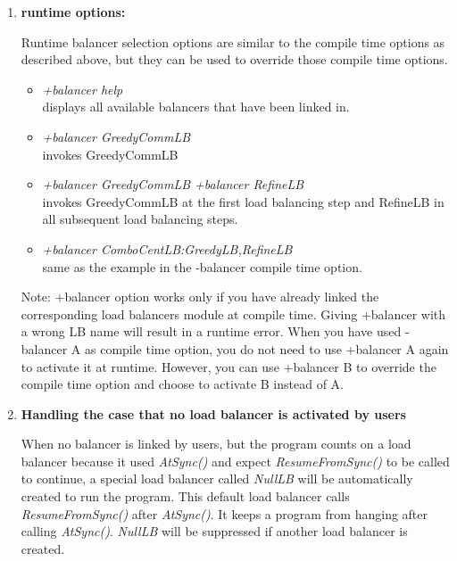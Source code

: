 \begin{enumerate}
{\tt charm/src/libs/ck-libs/parmetis/METISLib/.}

A pre-requisite for use of this library is to compile the METIS
library by ``make METIS'' under charm/tmp after compiling \charmpp{}.

\item {\bf runtime options:}

Runtime balancer selection options are similar to the compile time
options as described above, but they can be used to override those
compile time options.

\begin{itemize}
\item {\em +balancer help} \\
  displays all available balancers that have been linked in.
\item {\em +balancer GreedyCommLB} \\
  invokes GreedyCommLB
\item {\em +balancer GreedyCommLB +balancer RefineLB} \\
  invokes GreedyCommLB at the first load balancing step and RefineLB in all
subsequent load balancing steps.
\item {\em +balancer ComboCentLB:GreedyLB,RefineLB}  \\
  same as the example in the -balancer compile time option.
\end{itemize}

Note: +balancer option works only if you have already linked the corresponding 
load balancers module at compile time. 
Giving +balancer with a wrong LB name will result in a runtime error.
When you have used -balancer A as compile time option, you do not need to use 
+balancer A again to activate it at runtime. However, you can 
use +balancer B to override the compile time option and choose to
activate B instead of A.

\item {\bf Handling the case that no load balancer is activated by users}

When no balancer is linked by users, 
but the program counts on a load balancer because it used {\em AtSync()}
and expect {\em ResumeFromSync()} to be called to continue,
a special load balancer called {\em NullLB} will be 
automatically created to run the program.
This default load balancer calls {\em ResumeFromSync()} after {\em AtSync()}. 
It keeps a program from hanging after calling {\em AtSync()}.
{\em NullLB} will be suppressed if another load balancer is created.


\end{enumerate}
